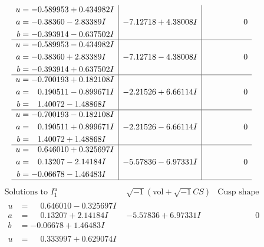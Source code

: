 \documentclass[1p]{elsarticle_modified}
\theoremstyle{definition}
\newcommand{\I}{\sqrt{-1}}
\begin{document}
$$\begin{array}{c|c|c}
\begin{aligned}
u &= -0.589953 + 0.434982 I \\
a &= -0.38360 - 2.83389 I \\
b &= -0.393914 - 0.637502 I\end{aligned}
 & -7.12718 + 4.38008 I & \phantom{-0.000000 } 0 \\ \hline\begin{aligned}
u &= -0.589953 - 0.434982 I \\
a &= -0.38360 + 2.83389 I \\
b &= -0.393914 + 0.637502 I\end{aligned}
 & -7.12718 - 4.38008 I & \phantom{-0.000000 } 0 \\ \hline\begin{aligned}
u &= -0.700193 + 0.182108 I \\
a &= \phantom{-}0.190511 - 0.899671 I \\
b &= \phantom{-}1.40072 - 1.48868 I\end{aligned}
 & -2.21526 + 6.66114 I & \phantom{-0.000000 } 0 \\ \hline\begin{aligned}
u &= -0.700193 - 0.182108 I \\
a &= \phantom{-}0.190511 + 0.899671 I \\
b &= \phantom{-}1.40072 + 1.48868 I\end{aligned}
 & -2.21526 - 6.66114 I & \phantom{-0.000000 } 0 \\ \hline\begin{aligned}
u &= \phantom{-}0.646010 + 0.325697 I \\
a &= \phantom{-}0.13207 - 2.14184 I \\
b &= -0.06678 - 1.46483 I\end{aligned}
 & -5.57836 - 6.97331 I & \phantom{-0.000000 } 0\\
 \hline 
 \end{array}$$\newpage$$\begin{array}{c|c|c}  
\text{Solutions to }I^u_{1}& \I (\text{vol} + \sqrt{-1}CS) & \text{Cusp shape}\\
 \hline 
\begin{aligned}
u &= \phantom{-}0.646010 - 0.325697 I \\
a &= \phantom{-}0.13207 + 2.14184 I \\
b &= -0.06678 + 1.46483 I\end{aligned}
 & -5.57836 + 6.97331 I & \phantom{-0.000000 } 0 \\ \hline\begin{aligned}
u &= \phantom{-}0.333997 + 0.629074 I \\

\end{aligned}
\end{array}$$
\end{document}
